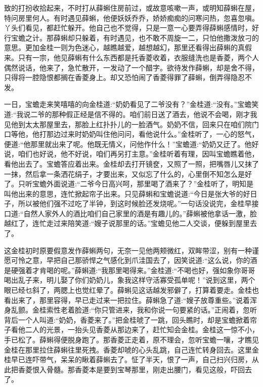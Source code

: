 \begin{parag}
致的打扮收拾起来，不时打从薛蝌住房前过，或故意咳嗽一声，或明知薛蝌在屋，特问房里何人。有时遇见薛蝌，他便妖妖乔乔，娇娇痴痴的问寒问热，忽喜忽嗔。丫头们看见，都赶忙躲开。他自己也不觉得，只是一意一心要弄得薛蝌感情时，好行宝蟾之计。那薛蝌却只躲着，有时遇见，也不敢不周旋一二，只怕他撒泼放刁的意思。更加金桂一则为色迷心，越瞧越爱，越想越幻，那里还看得出薛蝌的真假来。只有一宗，他见薛蝌有什么东西都是托香菱收着，衣服缝洗也是香菱，两个人偶然说话，他来了，急忙散开，一发动了一个醋字。欲待发作薛蝌，却是舍不得，只得将一腔隐恨都搁在香菱身上。却又恐怕闹了香菱得罪了薛蝌，倒弄得隐忍不发。
\end{parag}


\begin{parag}
    一日，宝蟾走来笑嘻嘻的向金桂道:“奶奶看见了二爷没有？”金桂道:“没有。”宝蟾笑道:“我说二爷的那种假正经是信不得的。咱们前日送了酒去，他说不会喝，刚才我见他到太太那屋里去，那脸上红扑扑儿的一脸酒气。奶奶不信，回来只在咱们院门口等他，他打那边过来时奶奶叫住他问问，看他说什么。”金桂听了，一心的怒气，便道:“他那里就出来了呢。他既无情义，问他作什么！”宝蟾道:“奶奶又迂了。他好说，咱们也好说，他不好说，咱们再另打主意。”金桂听着有理，因叫宝蟾瞧着他，看他出去了。宝蟾答应着出来。金桂却去打开镜奁，又照了一照，把嘴唇儿又抹了一抹，然后拿一条洒花绢子，才要出来，又似忘了什么的，心里倒不知怎么是好了。只听宝蟾外面说道:“二爷今日高兴呵，那里喝了酒来了？”金桂听了，明知是叫他出来的意思，连忙掀起帘子出来。只见薛蝌和宝蟾说道:“今日是张大爷的好日子，所以被他们强不过吃了半钟，到这时候脸还发烧呢。”一句话没说完，金桂早接口道:“自然人家外人的酒比咱们自己家里的酒是有趣儿的。”薛蝌被他拿话一激，脸越红了，连忙走过来陪笑道:“嫂子说那里的话。”宝蟾见他二人交谈，便躲到屋里去了。
\end{parag}


\begin{parag}
    这金桂初时原要假意发作薛蝌两句，无奈一见他两颊微红，双眸带涩，别有一种谨愿可怜之意，早把自己那骄悍之气感化到爪洼国去了，因笑说道:“这么说，你的酒是硬强着才肯喝的呢。”薛蝌道:“我那里喝得来。”金桂道:“不喝也好，强如象你哥哥喝出乱子来，明儿娶了你们奶奶儿，象我这样守活寡受孤单呢！”说到这里，两个眼已经乜斜了，两腮上也觉红晕了。薛蝌见这话越发邪僻了，打算着要走。金桂也看出来了，那里容得，早已走过来一把拉住。薛蝌急了道:“嫂子放尊重些。”说着浑身乱颤。金桂索性老着脸道:“你只管进来，我和你说一句要紧的话。”正闹着，忽听背后一个人叫道:“奶奶，香菱来了。”把金桂唬了一跳，回头瞧时，却是宝蟾掀着帘子看他二人的光景，一抬头见香菱从那边来了，赶忙知会金桂。金桂这一惊不小，手已松了。薛蝌得便脱身跑了。那香菱正走着，原不理会，忽听宝蟾一嚷，才瞧见金桂在那里拉住薛蝌往里死拽。香菱却唬的心头乱跳，自己连忙转身回去。这里金桂早已连吓带气，呆呆的瞅着薛蝌去了。怔了半天，恨了一声，自己扫兴归房，从此把香菱恨入骨髓。那香菱本是要到宝琴那里，刚走出腰门，看见这般，吓回去了。
\end{parag}


